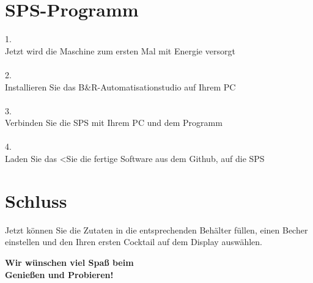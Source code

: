 \documentclass[10pt,a4paper]{report}
\begin{document}
	\chapter{SPS-Programm}
	1.\\
	Jetzt wird die Maschine zum ersten Mal mit Energie versorgt\\
	\\
	2.\\
	Installieren Sie das B\&R-Automatisationstudio auf Ihrem PC\\
	\\
	3.\\
	Verbinden Sie die SPS mit Ihrem PC und dem Programm\\
	\\
	4.\\
	Laden Sie das <Sie die fertige Software aus dem Github, auf die SPS\\
	
	\chapter{Schluss}
	Jetzt können Sie die Zutaten in die entsprechenden Behälter füllen, einen Becher einstellen und den Ihren ersten Cocktail auf dem Display auswählen.\\
	[6cm]
	\begin{center}
	\textbf{\huge{Wir wünschen viel Spaß beim \\
	Genießen und Probieren!}}
	\end{center}

	
\end{document}
